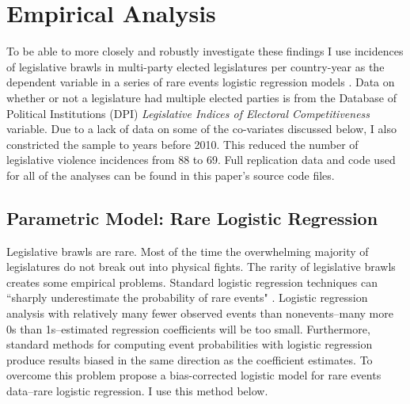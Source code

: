 \documentclass[a4paper]{article}\usepackage{graphicx, color}
\begin{document}



\section{Empirical Analysis}

To be able to more closely and robustly investigate these findings I use incidences of legislative brawls in multi-party elected legislatures per country-year as the dependent variable in a series of rare events logistic regression models \citep{KingRareEvents2001, KingRareEventsPA2001}. Data on whether or not a legislature had multiple elected parties is from the Database of Political Institutions (DPI) \citep[updated to 2010]{DPI2001} {\emph{Legislative Indices of Electoral Competitiveness}} variable. Due to a lack of data on some of the co-variates discussed below, I also constricted the sample to years before 2010. This reduced the number of legislative violence incidences from 88 to 69. Full replication data and code used for all of the analyses can be found in this paper's source code files.

\subsection{Parametric Model: Rare Logistic Regression}

Legislative brawls are rare. Most of the time the overwhelming majority of legislatures do not break out into physical fights. The rarity of legislative brawls creates some empirical problems. Standard logistic regression techniques can ``sharply underestimate the probability of rare events" \cite[137]{KingRareEventsPA2001}. Logistic regression analysis with relatively many fewer observed events than nonevents--many more 0s than 1s--estimated regression coefficients will be too small. Furthermore, standard methods for computing event probabilities with logistic regression produce results biased in the same direction as the coefficient estimates. To overcome this problem \cite{KingRareEventsPA2001} propose a bias-corrected logistic model for rare events data--rare logistic regression. I use this method below.
\end{document}
